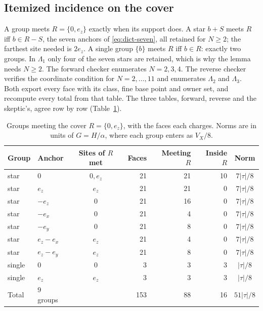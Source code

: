 \subsection{Itemized incidence on the cover}
\label{sec:ax1-incidence}
A group meets $R=\{0,e_z\}$ exactly when its support does. A star $b+S$ meets
$R$ iff $b\in R-S$, the seven anchors of \eqref{eq:dict-seven}, all retained
for $N\ge2$; the farthest site needed is $2e_z$. A single group $\{b\}$ meets
$R$ iff $b\in R$: exactly two groups. In $\Lambda_1$ only four of the seven
stars are retained, which is why the lemma needs $N\ge2$. The forward checker
enumerates $N=2,3,4$. The reverse checker verifies the coordinate condition
for $N=2,\dots,11$ and enumerates $\Lambda_2$ and $\Lambda_3$. Both export
every face with its class, fine base point and owner set, and recompute every
total from that table. The three tables, forward, reverse and the skeptic's,
agree row by row (Table~\ref{tab:ax1-incidence}).

\begin{table}[htbp]
\centering\small
\caption{Groups meeting the cover $R=\{0,e_z\}$, with the faces each charges.
Norms are in units of $G=H/\alpha$, where each group enters as $V_X/8$.}
\label{tab:ax1-incidence}
\begin{tabular}{llcrrrc}
\toprule
Group & Anchor & Sites of $R$ met & Faces & Meeting $R$ & Inside $R$ & Norm\\
\midrule
star & $0$ & $0,e_z$ & 21 & 21 & 10 & $7|\tau|/8$\\
star & $e_z$ & $e_z$ & 21 & 21 & 0 & $7|\tau|/8$\\
star & $-e_z$ & $0$ & 21 & 16 & 0 & $7|\tau|/8$\\
star & $-e_x$ & $0$ & 21 & 4 & 0 & $7|\tau|/8$\\
star & $-e_y$ & $0$ & 21 & 8 & 0 & $7|\tau|/8$\\
star & $e_z-e_x$ & $e_z$ & 21 & 4 & 0 & $7|\tau|/8$\\
star & $e_z-e_y$ & $e_z$ & 21 & 8 & 0 & $7|\tau|/8$\\
single & $0$ & $0$ & 3 & 3 & 3 & $|\tau|/8$\\
single & $e_z$ & $e_z$ & 3 & 3 & 3 & $|\tau|/8$\\
\midrule
Total & 9 groups & & 153 & 88 & 16 & $51|\tau|/8$\\
\bottomrule
\end{tabular}
\end{table}

